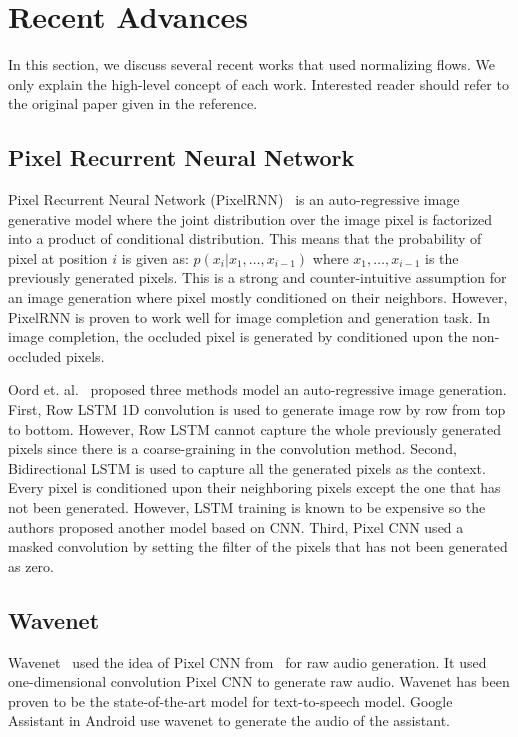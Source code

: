 \documentclass[runningheads]{llncs}
\begin{document}
\section{Recent Advances}
In this section, we discuss several recent works that used normalizing flows. We only explain the high-level concept of each work. Interested reader should refer to the original paper given in the reference.
\subsection{Pixel Recurrent Neural Network}
Pixel Recurrent Neural Network (PixelRNN)~\cite{oord2016pixel} is an auto-regressive image generative model where the joint distribution over the image pixel is factorized into a product of conditional distribution. This means that the probability of pixel at position $i$ is given as: $p(x_i | x_1, \dots, x_{i-1})$ where $x_1, \dots, x_{i-1}$ is the previously generated pixels. This is a strong and counter-intuitive assumption for an image generation where pixel mostly conditioned on their neighbors. However, PixelRNN is proven to  work well for image completion and generation task. In image completion, the occluded pixel is generated by conditioned upon the non-occluded pixels.

Oord et. al.~\cite{oord2016pixel} proposed three methods model an auto-regressive image generation.  First, Row LSTM 1D convolution is used to generate image row by row from top to bottom. However, Row LSTM cannot capture the whole previously generated pixels since there is a coarse-graining in the convolution method. Second, Bidirectional LSTM is used to capture all the generated pixels as the context. Every pixel is conditioned upon their neighboring pixels except the one that has not been generated. However, LSTM training is known to be expensive so the authors proposed another model based on CNN. Third, Pixel CNN used a masked convolution by setting the filter of the pixels that has not been generated as zero.


\subsection{Wavenet}
Wavenet~\cite{van2016wavenet} used the idea of Pixel CNN from~\cite{oord2016pixel} for raw audio generation. It used one-dimensional convolution Pixel CNN to generate raw audio. Wavenet has been proven to be the state-of-the-art model for text-to-speech model. Google Assistant in Android use wavenet to generate the audio of the assistant. 
\end{document}

